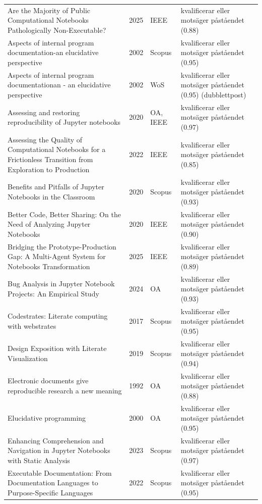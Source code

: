 \begin{longtable}{@{}%
  >{\raggedright\arraybackslash}p{}c%
  >{\raggedright\arraybackslash}p{}%
  >{\raggedright\arraybackslash}p{}@{}}
Are the Majority of Public Computational Notebooks Pathologically Non-Executable? & 2025 & IEEE & kvalificerar eller motsäger påståendet (0.88) \\
Aspects of internal program documentation-an elucidative perspective & 2002 & Scopus & kvalificerar eller motsäger påståendet (0.95) \\
Aspects of internal program documentationan - an elucidative perspective & 2002 & WoS & kvalificerar eller motsäger påståendet (0.95) (dubblettpost) \\
Assessing and restoring reproducibility of Jupyter notebooks & 2020 & OA, IEEE & kvalificerar eller motsäger påståendet (0.97) \\
Assessing the Quality of Computational Notebooks for a Frictionless Transition from Exploration to Production & 2022 & IEEE & kvalificerar eller motsäger påståendet (0.85) \\
Benefits and Pitfalls of Jupyter Notebooks in the Classroom & 2020 & Scopus & kvalificerar eller motsäger påståendet (0.93) \\
Better Code, Better Sharing: On the Need of Analyzing Jupyter Notebooks & 2020 & IEEE & kvalificerar eller motsäger påståendet (0.90) \\
Bridging the Prototype-Production Gap: A Multi-Agent System for Notebooks Transformation & 2025 & IEEE & kvalificerar eller motsäger påståendet (0.89) \\
Bug Analysis in Jupyter Notebook Projects: An Empirical Study & 2024 & OA & kvalificerar eller motsäger påståendet (0.93) \\
Codestrates: Literate computing with webstrates & 2017 & Scopus & kvalificerar eller motsäger påståendet (0.95) \\
Design Exposition with Literate Visualization & 2019 & Scopus & kvalificerar eller motsäger påståendet (0.94) \\
Electronic documents give reproducible research a new meaning & 1992 & OA & kvalificerar eller motsäger påståendet (0.88) \\
Elucidative programming & 2000 & OA & kvalificerar eller motsäger påståendet (0.95) \\
Enhancing Comprehension and Navigation in Jupyter Notebooks with Static Analysis & 2023 & Scopus & kvalificerar eller motsäger påståendet (0.97) \\
Executable Documentation: From Documentation Languages to Purpose-Specific Languages & 2022 & Scopus & kvalificerar eller motsäger påståendet (0.95) \\

\end{longtable}
